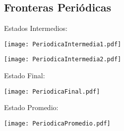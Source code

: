 \documentclass[11pt,letterpaper]{exam}
\begin{document}
\subsection{Fronteras Periódicas}
Estados Intermedios:
\begin{center}
\texttt{[image: PeriodicaIntermedia1.pdf]} 
\end{center}
\begin{center}
\texttt{[image: PeriodicaIntermedia2.pdf]} 
\end{center}
Estado Final:
\begin{center}
\texttt{[image: PeriodicaFinal.pdf]} 
\end{center}
Estado Promedio:
\begin{center}
\texttt{[image: PeriodicaPromedio.pdf]} 
\end{center}
\end{document}
